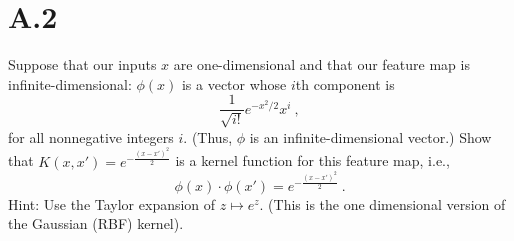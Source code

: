 \documentclass{article}
\newcommand{\1}{\mathbf{1}}
\begin{document}
\section*{A.2}
{\Large


Suppose that our inputs $x$ are one-dimensional and that our feature map is infinite-dimensional: 
$\phi( x) $ is a vector whose $i$th component is \\
\[
    \frac{1}{\sqrt{i!}} e^{-x^2/2}x^i\ ,
\]
for all nonnegative integers $i$. (Thus, $\phi$ is an infinite-dimensional vector.)
Show that $K(x, x') = e^{-\frac{(x-x')^2}{2}}$ is a kernel function for this feature map, i.e., \\
\[
    \phi (x) \cdot \phi (x') = e^{-\frac{(x-x')^2}{2}}\ .
\]
Hint: Use the Taylor expansion of $z \mapsto e^z$.
(This is the one dimensional version of the Gaussian  (RBF) kernel).\\

}
\end{document}
